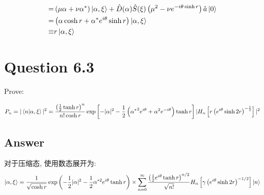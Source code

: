 \documentclass[twoside]{article}
\begin{document}
\begin{equation*}
\begin{split}
        =                                                                  &
        \left(\mu \alpha + \nu \alpha^*\right) \ket{\alpha, \xi} +
        \hat{D} (\alpha) \hat{S} (\xi) \left(\mu^2 - \nu e^{-i\theta \sinh r}\right)\hat{a}\ket{0}                                                                                 \\
        =                                                                  & \left(\alpha \cosh r + \alpha^* e^{i\theta} \sinh r\right) \ket{\alpha, \xi}                          \\
        \equiv                                                             & r \ket{\alpha, \xi}                                                                                   \\
    \end{split}
\end{equation*}


\section*{Question 6.3}
Prove:

\begin{equation*}
    P_n = |\braket{n|\alpha,\xi}|^2 =  \frac{\left(\frac{1}{2}\tanh r\right)^n}{n! \cosh r} \exp \left[-|\alpha|^2 - \frac{1}{2}\left({\alpha^{*}}^2 e^{i\theta} + \alpha^2 e^{-i\theta}\right)\tanh r\right] |H_n\left[r\left(e^{i\theta}\sinh 2r\right)^{-\frac{1}{2}}\right]|^2
\end{equation*}


\subsection*{Answer}

对于压缩态, 使用数态展开为:
\begin{equation*}
    \ket{\alpha, \xi} = \frac{1}{\sqrt{\cosh r}}
    \exp \left(-\frac{1}{2}|\alpha|^2 - \frac{1}{2}\alpha^{*2} e^{i\theta} \tanh r\right) \times
    \sum_{n=0}^\infty \frac{\left(\frac{1}{2}e^{i\theta} \tanh r \right)^{n/2}}{\sqrt{n!}} H_n \left[\gamma\left(e^{i\theta}\sinh 2r\right)^{-1/2}\right] \ket{n}
\end{equation*}
\end{document}
